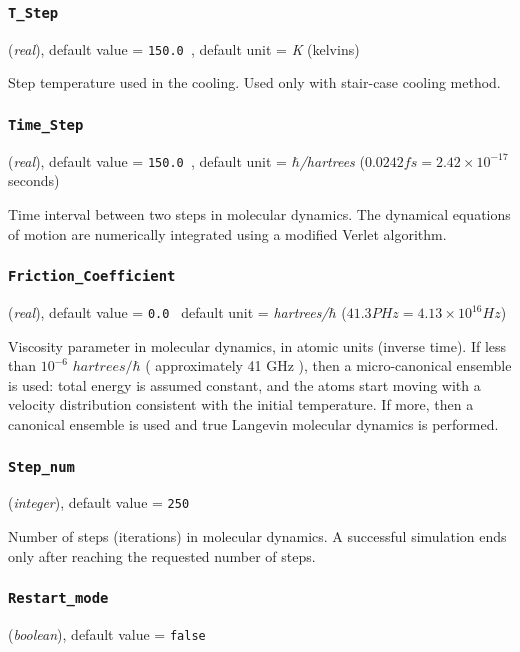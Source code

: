 \documentclass{article}
\begin{document}
\subsubsection{\tt T\_Step 
\label{TStep}}
({\it real}),
default value = {\tt 150.0 },
default unit = {\it K} (kelvins)

Step temperature used in the cooling. Used only with stair-case
cooling method.

\subsubsection{\tt Time\_Step 
\label{TimeStep}}
({\it real}),
default value = {\tt 150.0 },
default unit = {\it $\hbar$/hartrees} ($0.0242 fs = 2.42 \times 10^{-17}$ seconds)

Time interval between two steps in molecular dynamics.
The dynamical equations of motion are numerically integrated using a modified
Verlet algorithm. 

\subsubsection{\tt Friction\_Coefficient 
\label{FrictionCoefficient}}
({\it real}),
default value = {\tt 0.0 }
default unit = {\it hartrees/$\hbar$} ($41.3 PHz = 4.13 \times 10^{16} Hz$)

Viscosity parameter in molecular dynamics, in atomic units (inverse time).
If less than $10^{-6}$
{\it $hartrees/\hbar$} ( approximately 41 GHz ), then a micro-canonical ensemble is used: total energy is assumed
constant, and the atoms start moving with a velocity distribution consistent
with the initial temperature. If more, then a canonical ensemble is used and
true Langevin molecular dynamics is performed.

\subsubsection{\tt Step\_num 
\label{Stepnum}}
({\it integer}),
default value = {\tt 250 }

Number of steps (iterations) in molecular dynamics. A successful
simulation ends only after reaching the requested number of steps.

\subsubsection{\tt Restart\_mode 
\label{Restartmode}}
({\it boolean}),
default value = {\tt false }
\end{document}
